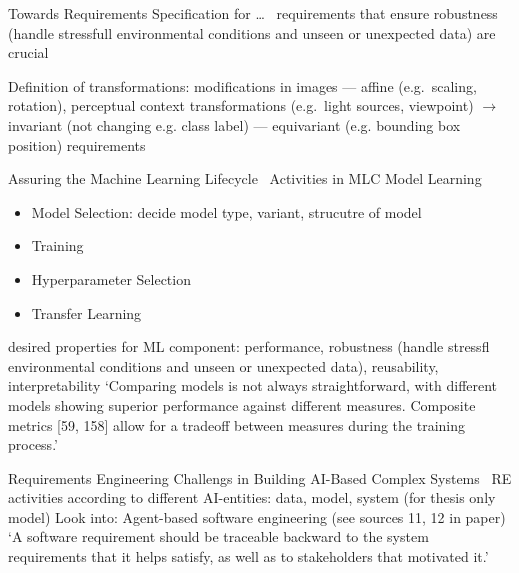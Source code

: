 Towards Requirements Specification for \ldots~\cite{hu_towards_2020}
requirements that ensure robustness (handle stressfull environmental conditions and unseen or
unexpected data) are crucial

Definition of transformations: modifications in images
--- affine (e.g.\ scaling, rotation), perceptual context transformations (e.g.\ light sources, viewpoint)
$\rightarrow$ invariant (not changing e.g. class label) --- equivariant (e.g. bounding
                box position) requirements


Assuring the Machine Learning Lifecycle~\cite{ashmore_assuring_2021}
Activities in MLC Model Learning
\begin{itemize}
    \item Model Selection: decide model type, variant, strucutre of model
    \item Training
    \item Hyperparameter Selection
    \item Transfer Learning
\end{itemize}
desired properties for ML component: performance, robustness (handle stressfl environmental
conditions and unseen or unexpected data), reusability, interpretability
`Comparing models is not always straightforward, with different models showing superior performance
against different measures. Composite metrics [59, 158] allow for a tradeoff between measures
during the training process.'

Requirements Engineering Challengs in Building AI-Based Complex Systems~\cite{belani_requirements_2019}
RE activities according to different AI-entities: data, model, system (for thesis only model)
Look into: Agent-based software engineering (see sources 11, 12 in paper)
`A software requirement should be traceable backward to the system requirements that it helps
satisfy, as well as to stakeholders that motivated it.'

